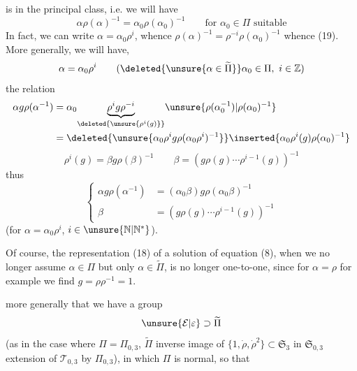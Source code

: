 
is in the principal class, i.e. we will have
\[
\alpha\rho(\alpha)^{-1}=\alpha_0\rho(\alpha_0)^{-1}\qquad\text{for }\alpha_0\in\Pi\text{ suitable}
\]
In fact, we can write $\alpha=\alpha_0\rho^i$, whence $\rho(\alpha)^{-1}=\rho^{-i}\rho(\alpha_0)^{-1}$ whence (19). More generally, we will have, 
\[
\alpha=\alpha_0\rho^i\qquad(\deleted{\unsure{\alpha\in\widetilde\Pi}}\alpha_0\in\Pi,\ i\in\mathbb Z)
\]
the relation
\[
\begin{aligned}
\alpha g\rho(\alpha^{-1})
&=\alpha_0\underset{\deleted{\unsure{\rho^i(g)}}}{\underbrace{\rho^i g\rho^{-i}}}\unsure{\rho(\alpha_0^{-1})|\rho(\alpha_0)^{-1}}\\
&=\deleted{\unsure{\alpha_0\rho^i g\rho(\alpha_0\rho^i)^{-1}}}\inserted{\alpha_0\rho^i(g)\rho(\alpha_0)^{-1}}
\end{aligned}
\]
\[
\rho^i(g)=\beta g\rho(\beta)^{-1}\qquad
\beta=(g\rho(g)\cdots\rho^{i-1}(g))^{-1}
\]
thus
\[
\left\{\begin{aligned}
\alpha g\rho(\alpha^{-1})&=(\alpha_0\beta)g\rho(\alpha_0\beta)^{-1}\\
\beta&=(g\rho(g)\cdots\rho^{i-1}(g))^{-1}
\end{aligned}\right. \tag{19}
\]
(for $\alpha=\alpha_0\rho^i$, $i\in\unsure{\mathbb N|\mathbb N^*}$).

Of course, the representation (18) of a solution of equation (8),  when we no longer assume $\alpha\in\Pi$ but only $\alpha\in\widetilde\Pi$, is no longer one-to-one, since for $\alpha=\rho$ for example we find  $g=\rho\rho^{-1}=1$.

 more generally that we have a group
\[
\unsure{\mathcal E|\varepsilon}\supset\widetilde\Pi
\]
(as in the  case where $\Pi=\Pi_{0,3}$, $\widetilde\Pi$ inverse image of $\{1,\dot\rho,\dot\rho^2\}\subset\mathfrak S_3$ in $\mathfrak S_{0,3}$ extension of $\mathcal T_{0,3}$ by $\Pi_{0,3}$), in which $\Pi$ is normal, so that 



